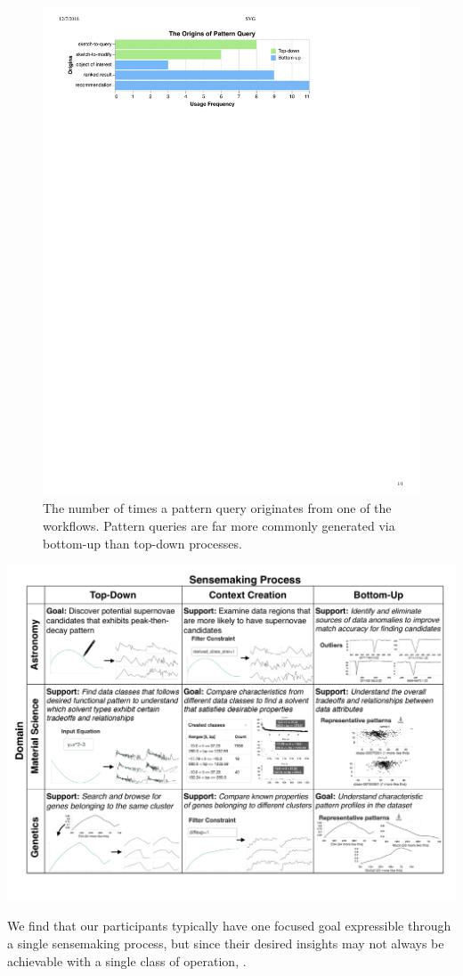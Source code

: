  \begin{figure}[h!]
  \captionsetup{font=normalsize,labelfont=normalsize}
    \centering
   \includegraphics[width=0.5\linewidth]{figures/the_origins_of_sketch.pdf}
   \vspace{-5pt}
   \caption{The number of times a pattern query originates from one of the workflows. Pattern queries are far more commonly generated via bottom-up than top-down processes.}\label{fig:origins_of_sketch}
 \end{figure}
 \begin{table}[h!]
  \captionsetup{font=normalsize,labelfont=normalsize}
   \centering
   \includegraphics[width=0.8\linewidth]{figures/science_task_new.pdf}
   \caption{ We find that our participants typically have one focused goal expressible through a single sensemaking process, but since their desired insights may not always be achievable with a single class of operation, .}%
   \label{science_task}
\end{table}
